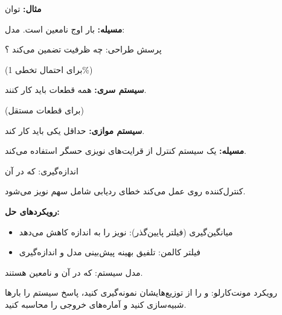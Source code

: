 \textbf{مثال:} توان 



\textbf{مسیله:} بار اوج نامعین است. مدل: 

پرسش طراحی: چه ظرفیت  تضمین می‌کند ؟

 (برای احتمال تخطی 1\%)


\textbf{سیستم سری:} همه قطعات باید کار کنند.

 (برای قطعات مستقل)

\textbf{سیستم موازی:} حداقل یکی باید کار کند.




\textbf{مسیله:} یک سیستم کنترل از قرایت‌های نویزی حسگر استفاده می‌کند.

اندازه‌گیری:  که در آن 

کنترل‌کننده روی  عمل می‌کند \lr{\mbox{\ensuremath{\to}}} خطای ردیابی شامل سهم نویز می‌شود.

\textbf{رویکردهای حل:}

\begin{itemize}
\tightlist
\item
  میانگین‌گیری (فیلتر پایین‌گذر): نویز را به اندازه  کاهش می‌دهد
\item
  فیلتر کالمن: تلفیق بهینه پیش‌بینی مدل و اندازه‌گیری
\end{itemize}


مدل سیستم:  که در آن  و \lr{$\tau$} نامعین هستند.

رویکرد مونت‌کارلو:  و \lr{$\tau$} را از توزیع‌هایشان نمونه‌گیری کنید، پاسخ سیستم را بارها شبیه‌سازی کنید و آماره‌های خروجی را محاسبه کنید.

